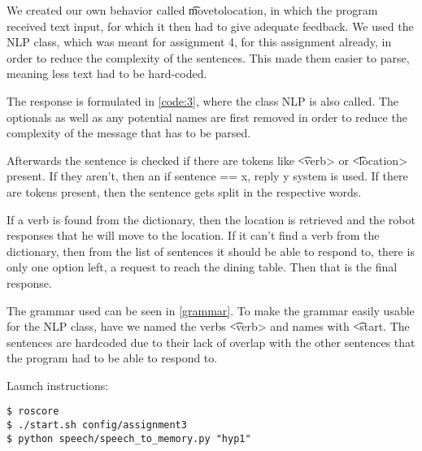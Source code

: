 
We created our own behavior called \t{movetolocation}, in which the program received text input, for which it then had to give adequate feedback. We used the NLP class, which was meant for assignment 4, for this assignment already, in order to reduce the complexity of the sentences. This made them easier to parse, meaning less text had to be hard-coded.



The response is formulated in \cref{code:3}, where the class NLP is also called. The optionals as well as any potential names are first removed in order to reduce the complexity of the message that has to be parsed. 

Afterwards the sentence is checked if there are tokens like \t{<verb>} or \t{<location>} present. If they aren't, then an if sentence == x, reply y system is used. If there are tokens present, then the sentence gets split in the respective words. 

If a verb is found from the dictionary, then the location is retrieved and the robot responses that he will move to the location. If it can't find a verb from the dictionary, then from the list of sentences it should be able to respond to, there is only one option left, a request to reach the dining table. Then that is the final response.



The grammar used can be seen in \cref{grammar}. To make the grammar easily usable for the NLP class, have we named the verbs \t{<verb>} and names with \t{<start}. The sentences are hardcoded due to their lack of overlap with the other sentences that the program had to be able to respond to.

Launch instructions:
\begin{lstlisting}
$ roscore
$ ./start.sh config/assignment3
$ python speech/speech_to_memory.py "hyp1"
\end{lstlisting}